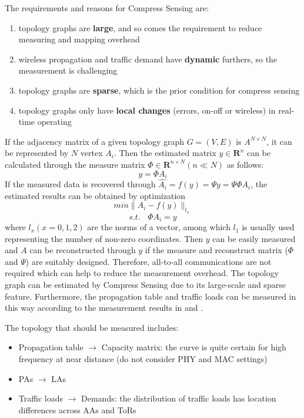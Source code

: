 \documentclass[journal,onecolumn,11pt]{IEEEtran}
\begin{document}
The requirements and reasons for Compress Sensing are:
\begin{enumerate}
  \item topology graphs are \textbf{large}, and so comes the requirement to reduce measuring and mapping overhead
  \item wireless propagation and traffic demand have \textbf{dynamic} furthers, so the measurement is challenging
  \item topology graphs are \textbf{sparse}, which is the prior condition for compress sensing
  \item topology graphs only have \textbf{local changes} (errors, on-off or wireless) in real-time operating
\end{enumerate}

If the adjacency matrix of a given topology graph $G=(V,E)$ is $A^{N\times N}$, it can be represented by $N$ vertex $A_i$. Then the estimated matrix $\hat{y}\in \textbf{R}^n$ can be calculated through the measure matrix $\Phi\in \textbf{R}^{n\times N} (n\ll N)$ as follows:
\begin{equation}
 y=\Phi A_i
 \label{estimation}
\end{equation}
If the measured data is recovered through $\hat{A_i}=f(y)=\Psi y=\Psi\Phi A_i$, the estimated results can be obtained by optimization
\begin{equation}
 min \parallel A_i-f(y) \parallel_{l_x}
 \label{recover1}
\end{equation}
\begin{equation}
 s.t.~~~~\Phi A_i = y
 \label{recover2}
\end{equation}
where $l_x (x=0,1,2)$ are the norms of a vector, among which $l_1$ is usually used representing the number of non-zero coordinates. Then $y$ can be easily measured and $A$ can be reconstructed through $y$ if the measure and reconstruct matrix ($\Phi$ and $\Psi$) are suitably designed. Therefore, all-to-all communications are not required which can help to reduce the measurement overhead. The topology graph can be estimated by Compress Sensing due to its large-scale and sparse feature. Furthermore, the propagation table and traffic loads can be measured in this way according to the measurement results in \cite{Halperin:2011:ADC:2018436.2018442} and \cite{Greenberg:2009:VSF:1592568.1592576}.

The topology that should be measured includes:
\begin{itemize}
  \item Propagation table $\rightarrow$ Capacity matrix: the curve is quite certain for high frequency at near distance (do not consider PHY and MAC settings) \cite{Zhou:2012:MMC:2342356.2342440,Halperin:2011:ADC:2018436.2018442}
  \item PAs $\rightarrow$ LAs
  \item Traffic loads $\rightarrow$ Demands: the distribution of traffic loads has location differences across AAs and ToRs \cite{Halperin:2011:ADC:2018436.2018442,Greenberg:2009:VSF:1592568.1592576}
\end{itemize}
\end{document}
